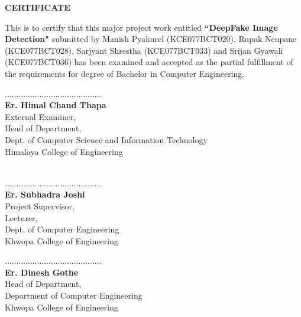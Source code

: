 \documentclass[12pt,a4paper]{report}
\begin{document}
    \thispagestyle{empty}
    \begin{center}
      \large{\textbf{CERTIFICATE}}
    \end{center}
    \vspace{1cm}
    This is to certify that this major project work entitled \textbf{``DeepFake Image Detection"} submitted by Manish Pyakurel (KCE077BCT020), Rupak Neupane (KCE077BCT028), Sarjyant Shrestha (KCE077BCT033) and Srijan Gyawali\\(KCE077BCT036) has been examined and accepted as the partial fulfillment of the requirements for degree of Bachelor in Computer Engineering.\\
    \vspace{1in}
    \begin{multicols}{2}
      \begin{center}
        ..........................................\\
        \textbf{Er. Himal Chand Thapa}\\
        External Examiner,\\
        Head of Department,\\
        Dept. of Computer Science and Information Technology\\
        Himalaya College of Engineering\\
        \textbf{}\\
        
      \end{center}
    
    \columnbreak
      \begin{center}
        ..........................................\\
        \textbf{Er. Subhadra Joshi}\\
        Project Supervisor,\\
        Lecturer,\\
        Dept. of Computer Engineering\\
        Khwopa College of Engineering
      \end{center}
    \end{multicols}
    \vspace{1in}
    \begin{center}
      ..........................................\\
      \textbf{Er. Dinesh Gothe}\\
      Head of Department,\\
      Department of Computer Engineering\\
      Khwopa College of Engineering
    \end{center}
\end{document}
